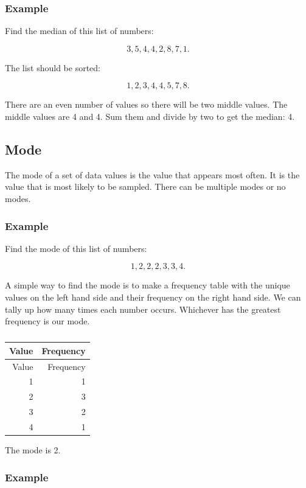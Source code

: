 \documentclass[
]{book}
\begin{document}
\hypertarget{example-2}{%
\subsubsection{Example}\label{example-2}}

Find the median of this list of numbers:

\[ 3, 5, 4, 4, 2, 8, 7, 1.\]

The list should be sorted:

\[ 1, 2, 3, 4, 4, 5, 7, 8. \]

There are an even number of values so there will be two middle values. The middle values are 4 and 4. Sum them and divide by two to get the median: 4.

\hypertarget{mode}{%
\subsection{Mode}\label{mode}}

The mode of a set of data values is the value that appears most often. It is the value that is most likely to be sampled. There can be multiple modes or no modes.

\hypertarget{example-3}{%
\subsubsection{Example}\label{example-3}}

Find the mode of this list of numbers:

\[ 1, 2, 2, 2, 3, 3, 4.\]

A simple way to find the mode is to make a frequency table with the unique values on the left hand side and their frequency on the right hand side. We can tally up how many times each number occurs. Whichever has the greatest frequency is our mode.

\begin{longtable}[]{@{}rr@{}}
\caption{\label{tab:table5}}\tabularnewline
\toprule
Value & Frequency \\
\midrule
\endfirsthead
\toprule
Value & Frequency \\
\midrule
\endhead
1 & 1 \\
2 & 3 \\
3 & 2 \\
4 & 1 \\
\bottomrule
\end{longtable}

The mode is 2.

\hypertarget{example-4}{%
\subsubsection{Example}\label{example-4}}
\end{document}
